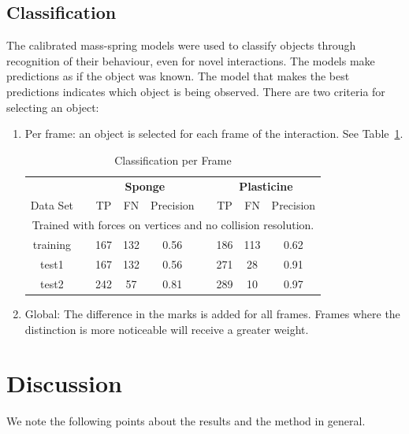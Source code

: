 \documentclass[journal]{IEEEtran}
\newcommand{\tref}[1]{Table~\ref{#1}}
\begin{document}
\subsection{Classification}

The calibrated mass-spring models were used to classify objects through recognition of their behaviour, even for novel interactions.  The models make predictions as if the object was known.  The model that makes the best predictions indicates which object is being observed.  There are two criteria for selecting an object:

\begin{enumerate}
 \item Per frame: an object is selected for each frame of the interaction. See \tref{tab:classperframe}.

\begin{table}[!t]
\renewcommand{\arraystretch}{1.3}
\caption{Classification per Frame}
\label{tab:classperframe}
\centering
\begin{tabular}{ccccccccc}
\hline
 & & \multicolumn{3}{c}{\bfseries Sponge} & & \multicolumn{3}{c}{\bfseries Plasticine} \\
Data Set & & TP & FN & Precision & & TP & FN & Precision\\
\hline\hline
 \multicolumn{9}{c}{Trained with forces on vertices and no collision resolution.} \\
\hline
   training & & 167 & 132 & 0.56 & & 186 & 113 & 0.62 \\
   test1 & & 167 & 132 & 0.56 & & 271 & 28 & 0.91 \\
   test2 & & 242 & 57 & 0.81 & & 289 & 10 & 0.97 \\ 
\hline
\end{tabular}
\end{table}

 \item Global: The difference in the marks is added for all frames.  Frames where the distinction is more noticeable will receive a greater weight.
\end{enumerate}



\section{Discussion}
\label{sec:discussion}
We note the following points about the results and the method in general.
\end{document}

